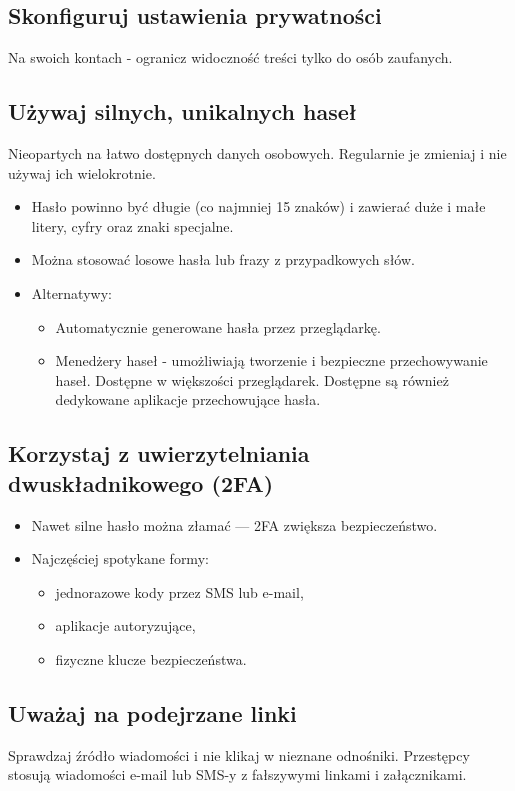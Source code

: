 \subsection{Skonfiguruj ustawienia prywatności}
Na swoich kontach - ogranicz widoczność treści tylko do osób zaufanych.

\subsection{Używaj silnych, unikalnych haseł}
Nieopartych na łatwo dostępnych danych osobowych. Regularnie je zmieniaj i nie używaj ich wielokrotnie.
\begin{itemize}
    \item Hasło powinno być długie (co najmniej 15 znaków) i zawierać duże i małe litery, cyfry oraz znaki specjalne.
    \item Można stosować losowe hasła lub frazy z przypadkowych słów.
    \item Alternatywy:
    \begin{itemize}
        \item Automatycznie generowane hasła przez przeglądarkę.
        \item Menedżery haseł - umożliwiają tworzenie i bezpieczne przechowywanie haseł. Dostępne w większości przeglądarek. Dostępne są również dedykowane aplikacje przechowujące hasła.
    \end{itemize}
\end{itemize}

\subsection{Korzystaj z uwierzytelniania dwuskładnikowego (2FA)}
\begin{itemize}
    \item Nawet silne hasło można złamać — 2FA zwiększa bezpieczeństwo.
    \item Najczęściej spotykane formy:
    \begin{itemize}
        \item jednorazowe kody przez SMS lub e-mail,
        \item aplikacje autoryzujące,
        \item fizyczne klucze bezpieczeństwa.
    \end{itemize}
\end{itemize}

\subsection{Uważaj na podejrzane linki}
Sprawdzaj źródło wiadomości i nie klikaj w nieznane odnośniki. Przestępcy stosują wiadomości e-mail lub SMS-y z fałszywymi linkami i załącznikami.


